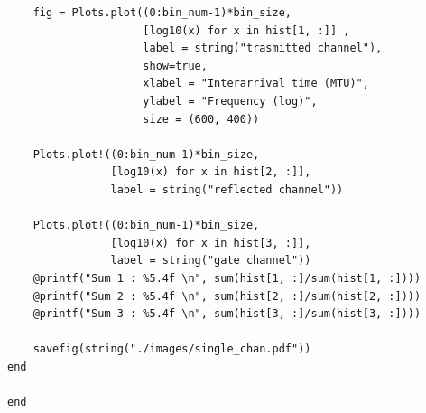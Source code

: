 \documentclass[10pt, final]{article}
\begin{document}
\begin{mdframed}
\begin{lstlisting}
    fig = Plots.plot((0:bin_num-1)*bin_size,
                     [log10(x) for x in hist[1, :]] ,
                     label = string("trasmitted channel"),
                     show=true,
                     xlabel = "Interarrival time (MTU)",
                     ylabel = "Frequency (log)",
                     size = (600, 400))

    Plots.plot!((0:bin_num-1)*bin_size,
                [log10(x) for x in hist[2, :]],
                label = string("reflected channel"))

    Plots.plot!((0:bin_num-1)*bin_size,
                [log10(x) for x in hist[3, :]],
                label = string("gate channel"))
    @printf("Sum 1 : %5.4f \n", sum(hist[1, :]/sum(hist[1, :])))
    @printf("Sum 2 : %5.4f \n", sum(hist[2, :]/sum(hist[2, :])))
    @printf("Sum 3 : %5.4f \n", sum(hist[3, :]/sum(hist[3, :])))

    savefig(string("./images/single_chan.pdf"))
end

end
    \end{lstlisting}
\end{mdframed}
\end{document}
